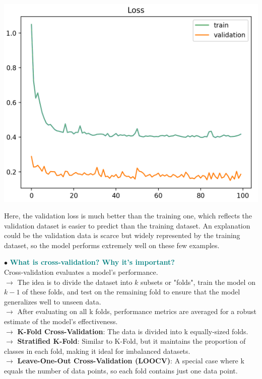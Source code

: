 \documentclass[letterpaper, 10.5pt,landscape]{article}
\begin{document}
\begin{multicols*}{3}
\vspace{-3mm}
\begin{center}
    \begin{minipage}{0.5\linewidth}
        \includegraphics[width=\textwidth]{figures/Second_scenario_Unrepresentative_Validation_Dataset.PNG}
    \end{minipage} 
\end{center}
\vspace{-3mm}
 
Here, the validation loss is much better than the training one, which reflects the validation dataset is easier to predict than the training dataset. An explanation could be the validation data is scarce but widely represented by the training dataset, so the model performs extremely well on these few examples.

\vspace{3pt}
$\bullet$ \textcolor{teal}{\textbf{What is cross-validation? Why it's important?}} \\
Cross-validation evaluates a model's performance. \\
$\rightarrow$ The idea is to divide the dataset into $k$ subsets or "folds", train the model on $k-1$ of these folds, and test on the remaining fold to ensure that the model generalizes well to unseen data. \\
$\rightarrow$ After evaluating on all k folds, performance metrics are averaged for a robust estimate of the model's effectiveness. \\
$\rightarrow$ \textbf{K-Fold Cross-Validation}: The data is divided into k equally-sized folds. \\
$\rightarrow$ \textbf{Stratified K-Fold}: Similar to K-Fold, but it maintains the proportion of classes in each fold, making it ideal for imbalanced datasets. \\
$\rightarrow$ \textbf{Leave-One-Out Cross-Validation (LOOCV)}: A special case where k equals the number of data points, so each fold contains just one data point.


\end{multicols*}
\end{document}
